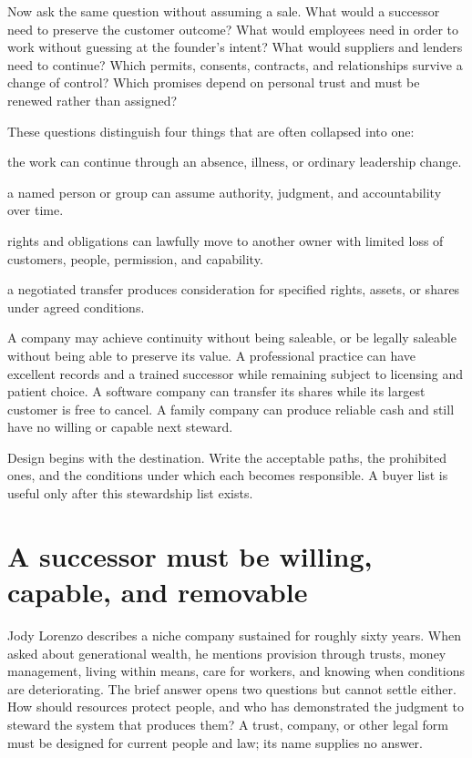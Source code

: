 Now ask the same question without assuming a sale. What would a successor need
to preserve the customer outcome? What would employees need in order to work
without guessing at the founder's intent? What would suppliers and lenders need
to continue? Which permits, consents, contracts, and relationships survive a
change of control? Which promises depend on personal trust and must be renewed
rather than assigned?

These questions distinguish four things that are often collapsed into one:

\begin{description}[leftmargin=0em,style=unboxed,itemsep=0.1em,
  topsep=0.2em,parsep=0em,labelsep=0.55em]
\item[Continuity] the work can continue through an absence, illness, or ordinary
  leadership change.
\item[Succession] a named person or group can assume authority, judgment, and
  accountability over time.
\item[Transfer] rights and obligations can lawfully move to another owner with
  limited loss of customers, people, permission, and capability.
\item[Sale] a negotiated transfer produces consideration for specified rights,
  assets, or shares under agreed conditions.
\end{description}

A company may achieve continuity without being saleable, or be legally
saleable without being able to preserve its value. A professional practice can
have excellent records and a trained successor while remaining subject to
licensing and patient choice. A software company can transfer its shares while
its largest customer is free to cancel. A family company can produce reliable
cash and still have no willing or capable next steward.

Design begins with the destination. Write the acceptable paths, the prohibited
ones, and the conditions under which each becomes responsible. A buyer list is
useful only after this stewardship list exists.

\section{A successor must be willing, capable, and removable}

Jody Lorenzo describes a niche company sustained for roughly sixty years. When
asked about generational wealth, he mentions provision through trusts, money
management, living within means, care for workers, and knowing when conditions
are deteriorating. The brief answer opens two questions but cannot settle
either. How should resources protect people, and who has demonstrated the
judgment to steward the system that produces them? A trust, company, or other
legal form must be designed for current people and law; its name supplies no
answer.

